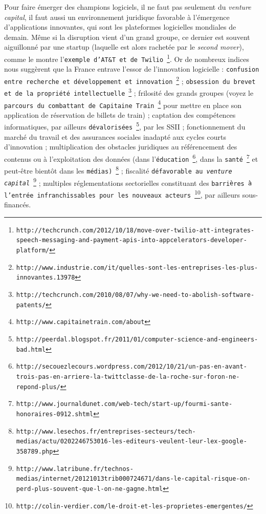 \documentclass[11pt,twoside,a4paper]{article}
\begin{document}
Pour faire {\'e}merger des champions logiciels, il ne faut pas seulement du \emph{venture capital}, il faut aussi un environnement juridique favorable {\`a} l'{\'e}mergence d'applications innovantes, qui sont les plateformes logicielles mondiales de demain. M{\^e}me si la disruption vient d'un grand groupe, ce dernier est souvent aiguillonn{\'e} par une startup (laquelle est alors rachet{\'e}e par le \emph{second mover}), comme le montre l'\texttt{exemple d'AT\&T et de Twilio}~\footnote{\texttt{http://techcrunch.com/2012/10/18/move-over-twilio-att-integrates-speech-messaging-and-payment-apis-into-appcelerators-developer-platform/}}. Or de nombreux indices nous sugg{\`e}rent que la France entrave l'essor de l'innovation logicielle : \texttt{confusion entre recherche et d{\'e}veloppement et innovation}~\footnote{\texttt{http://www.industrie.com/it/quelles-sont-les-entreprises-les-plus-innovantes.13978}} ; \texttt{obsession du brevet et de la propri{\'e}t{\'e} intellectuelle}~\footnote{\texttt{http://techcrunch.com/2010/08/07/why-we-need-to-abolish-software-patents/}} ; frilosit{\'e} des grands groupes (voyez le \texttt{parcours du combattant de Capitaine Train}~\footnote{\texttt{http://www.capitainetrain.com/about}} pour mettre en place son application de r{\'e}servation de billets de train) ; captation des comp{\'e}tences informatiques, par ailleurs \texttt{d{\'e}valoris{\'e}es}~\footnote{\texttt{http://peerdal.blogspot.fr/2011/01/computer-science-and-engineers-bad.html}}, par les SSII ; fonctionnement du march{\'e} du travail et des assurances sociales inadapt{\'e} aux cycles courts d'innovation ; multiplication des obstacles juridiques au r{\'e}f{\'e}rencement des contenus ou {\`a} l'exploitation des donn{\'e}es (dans l'\texttt{{\'e}ducation}~\footnote{\texttt{http://secouezlecours.wordpress.com/2012/10/21/un-pas-en-avant-trois-pas-en-arriere-la-twittclasse-de-la-roche-sur-foron-ne-repond-plus/}}, dans la \texttt{sant{\'e}}~\footnote{\texttt{http://www.journaldunet.com/web-tech/start-up/fourmi-sante-honoraires-0912.shtml}} et peut-{\^e}tre bient{\^o}t dans les \texttt{m{\'e}dias)}~\footnote{\texttt{http://www.lesechos.fr/entreprises-secteurs/tech-medias/actu/0202246753016-les-editeurs-veulent-leur-lex-google-358789.php}} ; fiscalit{\'e} \texttt{d{\'e}favorable au \emph{venture capital}}~\footnote{\texttt{http://www.latribune.fr/technos-medias/internet/20121013trib000724671/dans-le-capital-risque-on-perd-plus-souvent-que-l-on-ne-gagne.html}} ; multiples r{\'e}glementations sectorielles constituant des \texttt{barri{\`e}res {\`a} l'entr{\'e}e infranchissables pour les nouveaux acteurs}~\footnote{\texttt{http://colin-verdier.com/le-droit-et-les-proprietes-emergentes/}}, par ailleurs sous-financ{\'e}s. ~\\
\end{document}
